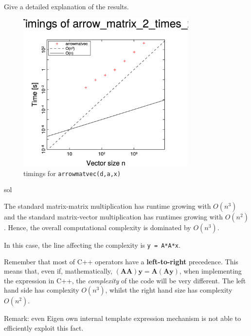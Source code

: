 \begin{samproblem}
\begin{subproblem}{}
  Give a detailed explanation of the results.

 \begin{figure}[ht]
\centering
\includegraphics[width=0.8\textwidth]{./Assignments/Codes/MatVec/ArrowMatrix/arrowmatvec_timing.eps}
\caption{timings for \texttt{arrowmatvec(d,a,x)}}
\label{fig:arrowmatvectiming}
\end{figure}

 \begin{samwriteprbpart}{sol}
  \begin{samsolution}
  The standard matrix-matrix multiplication has runtime growing with $O(n^3)$ and the standard
  matrix-vector multiplication has runtimes growing with $O(n^2)$. Hence, the overall
  computational complexity is dominated by $O(n^3)$.

  In this case, the line affecting the complexity is \texttt{y = A*A*x}.

  Remember that most of C++ operators have a \textbf{left-to-right} precedence. This means that,
  even if,
  mathematically, $(\mathbf{A} \mathbf{A}) \mathbf{y} = \mathbf{A} (\mathbf{A} \mathbf{y})$, when
  implementing the expression in C++, the \emph{complexity} of the code will be very different. The left hand
  side has complexity $O(n^3)$, whilst the right hand size has complexity $O(n^2)$.

  Remark: even Eigen own internal template expression mechanism is not
  able to efficiently exploit this fact.
\end{samsolution}
\end{samwriteprbpart}
\end{subproblem}


\end{samproblem}
